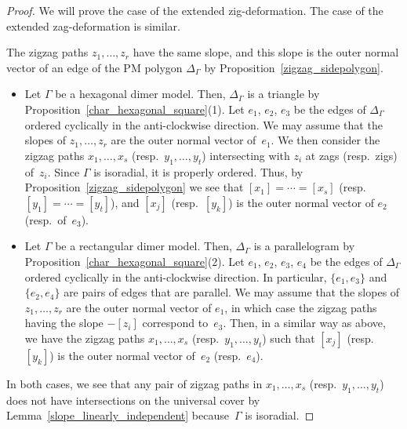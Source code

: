 \documentclass[pdftex]{sigma}%
\numberwithin{equation}{section}
\numberwithin{figure}{section}
\numberwithin{table}{section}
\begin{document}
\begin{proof}We will prove the case of the extended zig-deformation. The case of the extended zag-deformation is similar.

The zigzag paths $z_1,\dots,z_r$ have the same slope, and this slope is the outer normal vector of an edge of the PM polygon $\Delta_\Gamma$ by Proposition~\ref{zigzag_sidepolygon}.
\begin{itemize}\itemsep=0pt
\item[\rm (1)] Let $\Gamma$ be a hexagonal dimer model.
Then, $\Delta_\Gamma$ is a triangle by Proposition~\ref{char_hexagonal_square}(1).
Let $e_1$, $e_2$, $e_3$ be the edges of $\Delta_\Gamma$ ordered cyclically in the anti-clockwise direction.
We may assume that the slopes of $z_1,\dots,z_r$ are the outer normal vector of~$e_1$.
We then consider the zigzag paths $x_1,\dots,x_s$ (resp.\ $y_1,\dots,y_t$) intersecting with $z_i$ at zags (resp.\ zigs) of~$z_i$.
Since $\Gamma$ is isoradial, it is properly ordered.
Thus, by Proposition~\ref{zigzag_sidepolygon} we see that $[x_1]=\cdots=[x_s]$ (resp.\ $[y_1]=\cdots=[y_t]$), and $[x_j]$ (resp.~$[y_k]$) is the outer normal vector of $e_2$ (resp.\ of~$e_3$).

\item[\rm (2)] Let $\Gamma$ be a rectangular dimer model.
Then, $\Delta_\Gamma$ is a parallelogram by Proposition~\ref{char_hexagonal_square}(2).
Let $e_1$, $e_2$, $e_3$, $e_4$ be the edges of $\Delta_\Gamma$ ordered cyclically in the anti-clockwise direction.
In particular, $\{e_1,e_3\}$ and $\{e_2,e_4\}$ are pairs of edges that are parallel.
We may assume that the slopes of $z_1,\dots,z_r$ are the outer normal vector of $e_1$, in which case
the zigzag paths having the slope $-[z_i]$ correspond to~$e_3$.
Then, in a similar way as above, we have the zigzag paths $x_1,\dots,x_s$ (resp.\ $y_1,\dots,y_t$) such that $[x_j]$ (resp.~$[y_k]$) is the outer normal vector of~$e_2$ (resp.\ $e_4$).
\end{itemize}
In both cases, we see that any pair of zigzag paths in $x_1,\dots,x_s$ (resp.\ $y_1,\dots,y_t$) does not have intersections on the universal cover by Lemma~\ref{slope_linearly_independent} because~$\Gamma$ is isoradial.


\end{proof}
\end{document}
